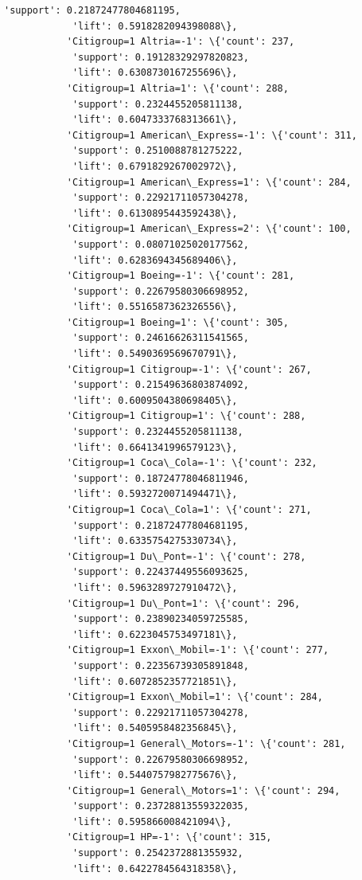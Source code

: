 \documentclass[11pt]{article}
\begin{document}
\begin{Verbatim}[commandchars=\\\{\}]
            'support': 0.21872477804681195,
            'lift': 0.5918282094398088\},
           'Citigroup=1 Altria=-1': \{'count': 237,
            'support': 0.19128329297820823,
            'lift': 0.6308730167255696\},
           'Citigroup=1 Altria=1': \{'count': 288,
            'support': 0.2324455205811138,
            'lift': 0.6047333768313661\},
           'Citigroup=1 American\_Express=-1': \{'count': 311,
            'support': 0.2510088781275222,
            'lift': 0.6791829267002972\},
           'Citigroup=1 American\_Express=1': \{'count': 284,
            'support': 0.22921711057304278,
            'lift': 0.6130895443592438\},
           'Citigroup=1 American\_Express=2': \{'count': 100,
            'support': 0.08071025020177562,
            'lift': 0.6283694345689406\},
           'Citigroup=1 Boeing=-1': \{'count': 281,
            'support': 0.22679580306698952,
            'lift': 0.5516587362326556\},
           'Citigroup=1 Boeing=1': \{'count': 305,
            'support': 0.24616626311541565,
            'lift': 0.5490369569670791\},
           'Citigroup=1 Citigroup=-1': \{'count': 267,
            'support': 0.21549636803874092,
            'lift': 0.6009504380698405\},
           'Citigroup=1 Citigroup=1': \{'count': 288,
            'support': 0.2324455205811138,
            'lift': 0.6641341996579123\},
           'Citigroup=1 Coca\_Cola=-1': \{'count': 232,
            'support': 0.18724778046811946,
            'lift': 0.5932720071494471\},
           'Citigroup=1 Coca\_Cola=1': \{'count': 271,
            'support': 0.21872477804681195,
            'lift': 0.6335754275330734\},
           'Citigroup=1 Du\_Pont=-1': \{'count': 278,
            'support': 0.22437449556093625,
            'lift': 0.5963289727910472\},
           'Citigroup=1 Du\_Pont=1': \{'count': 296,
            'support': 0.23890234059725585,
            'lift': 0.6223045753497181\},
           'Citigroup=1 Exxon\_Mobil=-1': \{'count': 277,
            'support': 0.22356739305891848,
            'lift': 0.6072852357721851\},
           'Citigroup=1 Exxon\_Mobil=1': \{'count': 284,
            'support': 0.22921711057304278,
            'lift': 0.5405958482356845\},
           'Citigroup=1 General\_Motors=-1': \{'count': 281,
            'support': 0.22679580306698952,
            'lift': 0.5440757982775676\},
           'Citigroup=1 General\_Motors=1': \{'count': 294,
            'support': 0.23728813559322035,
            'lift': 0.595866008421094\},
           'Citigroup=1 HP=-1': \{'count': 315,
            'support': 0.2542372881355932,
            'lift': 0.6422784564318358\},

\end{Verbatim}
\end{document}
